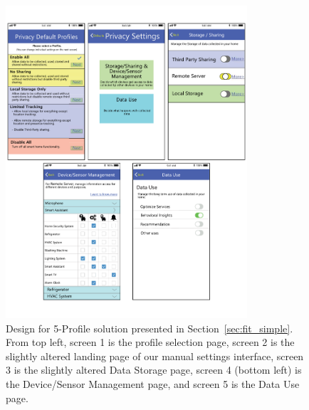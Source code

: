 \begin{figure}
	\centering
	\includegraphics[width=0.8\textwidth]{figures/cluster_simple.pdf}
	\caption{Design for 5-Profile solution presented in Section~\ref{sec:fit_simple}. From top left, screen 1 is the profile selection page, screen 2 is the slightly altered landing page of our manual settings interface, screen 3 is the slightly altered Data Storage page, screen 4 (bottom left) is the Device/Sensor Management page, and screen 5 is the Data Use page.}
	\label{fig:cluster_simple}
\end{figure}

